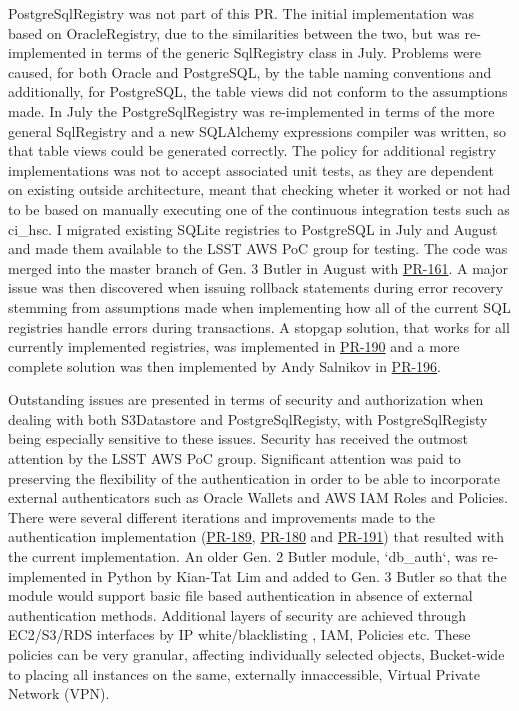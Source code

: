 PostgreSqlRegistry was not part of this PR. The initial implementation was based on OracleRegistry, due to the similarities between the two, but was re-implemented in terms of the generic SqlRegistry class in July. Problems were caused, for both Oracle and PostgreSQL, by the table naming conventions and additionally, for PostgreSQL, the table views did not conform to the assumptions made. In July the PostgreSqlRegistry was re-implemented in terms of the more general SqlRegistry and a new SQLAlchemy expressions compiler was written, so that table views could be generated correctly. The policy for additional registry implementations was not to accept associated unit tests, as they are dependent on existing outside architecture, meant that checking wheter it worked or not had to be based on manually executing one of the continuous integration tests such as ci\_hsc. I migrated existing SQLite registries to PostgreSQL in July and August and made them available to the LSST AWS PoC group for testing. The code was merged into the master branch of Gen. 3 Butler in August with \href{https://github.com/lsst/daf_butler/pull/161}{PR-161}. A major issue was then discovered when issuing rollback statements during error recovery stemming from assumptions made when implementing how all of the current SQL registries handle errors during transactions. A stopgap solution, that works for all currently implemented registries, was implemented in \href{https://github.com/lsst/daf_butler/pull/190}{PR-190} and a more complete solution was then implemented by Andy Salnikov in \href{https://github.com/lsst/daf_butler/pull/196}{PR-196}.


Outstanding issues are presented in terms of security and authorization when dealing with both S3Datastore and PostgreSqlRegisty, with PostgreSqlRegisty being especially sensitive to these issues. Security has received the outmost attention by the LSST AWS PoC group. Significant attention was paid to preserving the flexibility of the authentication in order to be able to incorporate external authenticators such as Oracle Wallets and AWS IAM Roles and Policies. There were several different iterations and improvements made to the authentication implementation (\href{https://github.com/lsst/daf_butler/pull/189}{PR-189}, \href{https://github.com/lsst/daf_butler/pull/180}{PR-180} and \href{https://github.com/lsst/daf_butler/pull/191}{PR-191}) that resulted with the current implementation. An older Gen. 2 Butler module, `db\_auth`, was re-implemented in Python by Kian-Tat Lim and added to Gen. 3 Butler so that the module would support basic file based authentication in absence of external authentication methods. Additional layers of security are achieved through EC2/S3/RDS interfaces by IP white/blacklisting , IAM, Policies etc. These policies can be very granular, affecting individually selected objects, Bucket-wide to placing all instances on the same, externally innaccessible, Virtual Private Network (VPN).

